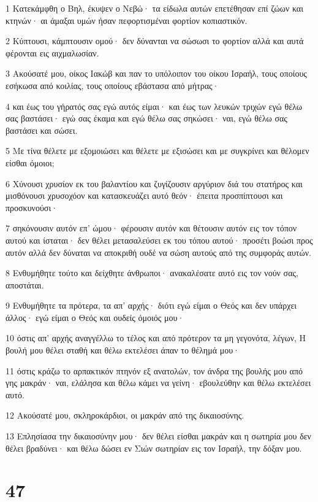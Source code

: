 \par 1 Κατεκάμφθη ο Βηλ, έκυψεν ο Νεβώ· τα είδωλα αυτών επετέθησαν επί ζώων και κτηνών· αι άμαξαι υμών ήσαν πεφορτισμέναι φορτίον κοπιαστικόν.
\par 2 Κύπτουσι, κάμπτουσιν ομού· δεν δύνανται να σώσωσι το φορτίον αλλά και αυτά φέρονται εις αιχμαλωσίαν.
\par 3 Ακούσατέ μου, οίκος Ιακώβ και παν το υπόλοιπον του οίκου Ισραήλ, τους οποίους εσήκωσα από κοιλίας, τους οποίους εβάστασα από μήτρας·
\par 4 και έως του γήρατός σας εγώ αυτός είμαι· και έως των λευκών τριχών εγώ θέλω σας βαστάσει· εγώ σας έκαμα και εγώ θέλω σας σηκώσει· ναι, εγώ θέλω σας βαστάσει και σώσει.
\par 5 Με τίνα θέλετε με εξομοιώσει και θέλετε με εξισώσει και με συγκρίνει και θέλομεν είσθαι όμοιοι;
\par 6 Χύνουσι χρυσίον εκ του βαλαντίου και ζυγίζουσιν αργύριον διά του στατήρος και μισθόνουσι χρυσοχόον και κατασκευάζει αυτό θεόν· έπειτα προσπίπτουσι και προσκυνούσι·
\par 7 σηκόνουσιν αυτόν επ' ώμου· φέρουσιν αυτόν και θέτουσιν αυτόν εις τον τόπον αυτού και ίσταται· δεν θέλει μετασαλεύσει εκ του τόπου αυτού· προσέτι βοώσι προς αυτόν αλλά δεν δύναται να αποκριθή ουδέ να σώση αυτούς από της συμφοράς αυτών.
\par 8 Ενθυμήθητε τούτο και δείχθητε άνθρωποι· ανακαλέσατε αυτό εις τον νούν σας, αποστάται.
\par 9 Ενθυμήθητε τα πρότερα, τα απ' αρχής· διότι εγώ είμαι ο Θεός και δεν υπάρχει άλλος· εγώ είμαι ο Θεός και ουδείς όμοιός μου·
\par 10 όστις απ' αρχής αναγγέλλω το τέλος και από πρότερον τα μη γεγονότα, λέγων, Η βουλή μου θέλει σταθή και θέλω εκτελέσει άπαν το θέλημά μου·
\par 11 όστις κράζω το αρπακτικόν πτηνόν εξ ανατολών, τον άνδρα της βουλής μου από γης μακράν· ναι, ελάλησα και θέλω κάμει να γείνη· εβουλεύθην και θέλω εκτελέσει αυτό.
\par 12 Ακούσατέ μου, σκληροκάρδιοι, οι μακράν από της δικαιοσύνης.
\par 13 Επλησίασα την δικαιοσύνην μου· δεν θέλει είσθαι μακράν και η σωτηρία μου δεν θέλει βραδύνει· και θέλω δώσει εν Σιών σωτηρίαν εις τον Ισραήλ, την δόξαν μου.

\chapter{47}

